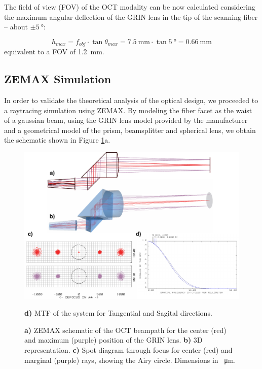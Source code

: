The field of view (FOV) of the OCT modality can be now calculated considering the maximum angular deflection of the GRIN lens in the tip of the scanning fiber -- about $\pm \SI{5}{\degree}$: 

\begin{equation}
h_{max} = f_{obj}\cdot \tan  \theta_{max} = \SI{7.5}{\milli\meter} \cdot \tan \SI{5}{\degree} = \SI{0.66}{\milli\meter}
\end{equation}
\noindent
equivalent to a FOV of \SI{1.2}{\milli\meter}.



\subsection*{ZEMAX Simulation}

In order to validate the theoretical analysis of the optical design, we proceeded to a raytracing simulation using ZEMAX. By modeling the fiber facet as the waist of a gaussian beam, using the GRIN lens model provided by the manufacturer and a geometrical model of the prism, beamsplitter and spherical lens, we obtain the schematic shown in Figure \ref{fig:BS}a. 

\begin{figure}[h!]\centering
      \includegraphics[width=\columnwidth]{figures/30_DesignSimulation/Optical/beamsplitterAll.pdf}
      \caption{\textbf{a)} ZEMAX schematic of the OCT beampath for the center (red) and maximum (purple) position of the GRIN lens.
      \textbf{b)} 3D representation.
      \textbf{c)} Spot diagram through focus for center (red) and marginal (purple) rays, showing the Airy circle. Dimensions in \SI{}{\micro\meter}.}
      \textbf{d)} MTF of the system for Tangential and Sagital directions.
      \label{fig:BS}
\end{figure}

